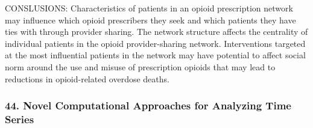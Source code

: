 \begin{itemize}
CONSLUSIONS: Characteristics of patients in an opioid prescription network may influence which opioid prescribers they seek and which patients they have ties with through provider sharing. The network structure affects the centrality of individual patients in the opioid provider-sharing network. Interventions targeted at the most influential patients in the network may have potential to affect social norm around the use and misuse of prescription opioids that may lead to reductions in opioid-related overdose deaths. 


\end{itemize}

\subsubsection*{44. Novel Computational Approaches for Analyzing Time Series}

